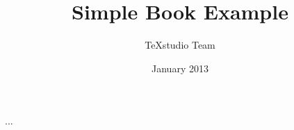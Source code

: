 \documentclass[a4paper,12pt]{book}
\begin{document}
    \raggedbottom

\author{TeXstudio Team}
\title{Simple Book Example}
\date{January 2013}

\frontmatter
\maketitle
\tableofcontents



\mainmatter
\setcounter{chapter}{-1}
















\begin{appendices}
	\renewcommand{\thechapter}{\arabic{chapter}}
	\setcounter{chapter}{0}
	
	...
\end{appendices}
\end{document}
